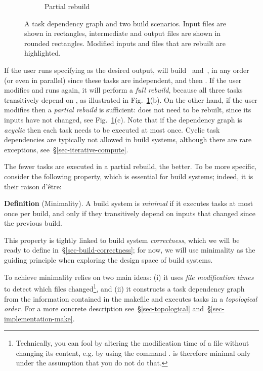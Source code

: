\begin{figure}
\begin{subfigure}[b]{0.32\linewidth}
\caption{Partial rebuild}
\end{subfigure}
\caption{A task dependency graph and two build scenarios. Input files are shown
in rectangles, intermediate and output files are shown in rounded rectangles.
Modified inputs and files that are rebuilt are highlighted.
\label{fig-make}}
\end{figure}

If the user runs \Make specifying  as the desired output, \Make
will build~ and~, in any order (or even in parallel) since these tasks are
independent, and then . If the user modifies  and runs
\Make again, it will perform a \emph{full rebuild}, because all three tasks
transitively depend on , as illustrated in Fig.~\ref{fig-make}(b).
On the other hand, if the user modifies  then a \emph{partial
rebuild} is sufficient:  does not need to be rebuilt, since its
inputs have not changed, see Fig.~\ref{fig-make}(c). Note that if the dependency
graph is \emph{acyclic} then each task needs to be executed at most once. Cyclic
task dependencies are typically not allowed in build systems, although there are
rare exceptions, see~\S\ref{sec-iterative-compute}.

The fewer tasks are executed in a partial rebuild, the better. To be more
specific, consider the following property, which is essential for build systems;
indeed, it is their raison d'\^etre:

\vspace{2mm}
\textbf{Definition} (Minimality). A build system is \emph{minimal} if it
executes tasks at most once per build, and only if they transitively depend on
inputs that changed since the previous build.\label{def-minimal}
\vspace{2mm}

\noindent
This property is tightly linked to build system \emph{correctness}, which we
will be ready to define in~\S\ref{sec-build-correctness}; for now, we will use
minimality as the guiding principle when exploring the design space of build
systems.

To achieve minimality \Make relies on two main ideas: (i) it uses \emph{file
modification times} to detect which files changed\footnote{Technically, you
can fool \Make by altering the modification time of a file without changing its
content, e.g. by using the command . \Make is therefore minimal only
under the assumption that you do not do that.}, and (ii) it constructs a task
dependency graph from the information contained in the makefile and executes
tasks in a \emph{topological order}. For a more concrete description
see~\S\ref{sec-topological} and~\S\ref{sec-implementation-make}.

